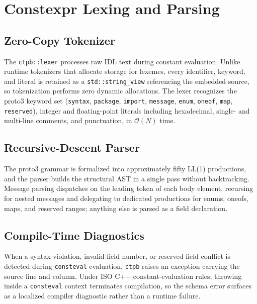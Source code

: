\section{Constexpr Lexing and Parsing}

\subsection{Zero-Copy Tokenizer}
The \texttt{ctpb::lexer} processes raw IDL text during constant evaluation. Unlike runtime tokenizers that allocate storage for lexemes, every identifier, keyword, and literal is retained as a \texttt{std::string\_view} referencing the embedded source, so tokenization performs zero dynamic allocations. The lexer recognizes the proto3 keyword set (\texttt{syntax}, \texttt{package}, \texttt{import}, \texttt{message}, \texttt{enum}, \texttt{oneof}, \texttt{map}, \texttt{reserved}), integer and floating-point literals including hexadecimal, single- and multi-line comments, and punctuation, in $\mathcal{O}(N)$ time.

\subsection{Recursive-Descent Parser}
The proto3 grammar is formalized into approximately fifty LL(1) productions, and the parser builds the structural AST in a single pass without backtracking. Message parsing dispatches on the leading token of each body element, recursing for nested messages and delegating to dedicated productions for enums, oneofs, maps, and reserved ranges; anything else is parsed as a field declaration.

\subsection{Compile-Time Diagnostics}
When a syntax violation, invalid field number, or reserved-field conflict is detected during \texttt{consteval} evaluation, \texttt{ctpb} raises an exception carrying the source line and column. Under ISO C++ constant-evaluation rules, throwing inside a \texttt{consteval} context terminates compilation, so the schema error surfaces as a localized compiler diagnostic rather than a runtime failure.

